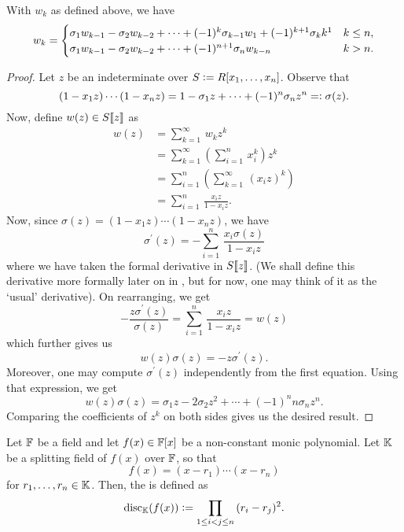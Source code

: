 \begin{theorem} \label{thm:newton}
    With $w_k$ as defined above, we have
    \[
        w_k = \begin{cases}
            \sigma_1 w_{k-1} - \sigma_2 w_{k-2} + \cdots + (-1)^k \sigma_{k-1} w_1 + (-1)^{k+1} \sigma_k k\footnotemark& k \leq n, \\
            \sigma_1 w_{k-1} - \sigma_2 w_{k-2} + \cdots + (-1)^{n+1} \sigma_{n} w_{k-n}& k > n.
        \end{cases}
    \]
\end{theorem}
\begin{proof}
    Let $z$ be an indeterminate over $S \vcentcolon= R[x_1, \ldots, x_n]$. Observe that
    \[
        (1-x_1z) \cdots (1-x_nz) = 1 - \sigma_1z + \cdots + (-1)^n \sigma_nz^n =\vcentcolon \sigma(z).
    \]
    Now, define $w(z) \in S\llbracket z \rrbracket$ as
    \begin{align*}
        w(z) &= \sum_{k=1}^{\infty} \, w_k z^k \\
        &= \sum_{k=1}^{\infty} \left( \sum_{i=1}^n \, x_i^k \right) z^k \\
        &= \sum_{i=1}^n \left( \sum_{k=1}^{\infty} \, (x_i z)^k \right) \\
        &= \sum_{i=1}^n \, \frac{x_iz}{1-x_iz}.
    \end{align*}
    Now, since $\sigma(z) = (1-x_1z)\cdots(1-x_nz)$, we have
    \[
        \sigma^{\prime}(z) = - \sum_{i=1}^n \, \frac{x_i \sigma(z)}{1-x_iz}
    \]
    where we have taken the formal derivative in $S\llbracket z \rrbracket$. (We shall define this derivative more formally later on in , but for now, one may think of it as the `usual' derivative). On rearranging, we get
    \[
        - \frac{z \sigma^{\prime}(z)}{\sigma(z)} = \sum_{i=1}^n \, \frac{x_iz}{1-x_iz} = w(z)
    \]
    which further gives us
    \[
        w(z)\sigma(z) = -z\sigma^{\prime}(z).
    \]
    Moreover, one may compute $\sigma^{\prime}(z)$ independently from the first equation. Using that expression, we get
    \[
        w(z) \sigma(z) = \sigma_1 z - 2 \sigma_2 z^2 + \cdots + (-1)^n n \sigma_n z^n.
    \]
    Comparing the coefficients of $z^k$ on both sides gives us the desired result.
\end{proof}

\begin{defn}
    Let $\mathbb{F}$ be a field and let $f(x) \in \mathbb{F}[x]$ be a non-constant monic polynomial. Let $\mathbb{K}$ be a splitting field of $f(x)$ over $\mathbb{F}$, so that 
    \[
        f(x) = (x-r_1)\cdots(x-r_n)
    \]
    for $r_1,\ldots,r_n \in \mathbb{K}$. Then, the  is defined as
    \[
        \operatorname{disc}_{\mathbb{K}}(f(x)) \vcentcolon= \prod_{1 \leq i < j \leq n} \, (r_i - r_j)^2.
    \]
\end{defn}

